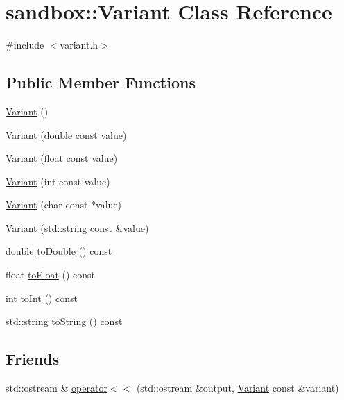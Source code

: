 \hypertarget{classsandbox_1_1_variant}{\section{sandbox\-:\-:Variant Class Reference}
\label{classsandbox_1_1_variant}
}


{\ttfamily \#include $<$variant.\-h$>$}

\subsection*{Public Member Functions}
\begin{DoxyCompactItemize}
\item 
\hyperlink{classsandbox_1_1_variant_a0edc9e6694f15b9938dc40f68cc9464b}{Variant} ()
\item 
\hyperlink{classsandbox_1_1_variant_a762c4c281191a8bb303a317c0e0da8ef}{Variant} (double const value)
\item 
\hyperlink{classsandbox_1_1_variant_a965d4621a0d600a96d02cd696703e82c}{Variant} (float const value)
\item 
\hyperlink{classsandbox_1_1_variant_a8498e32ad2db5751c2b8111a9320a006}{Variant} (int const value)
\item 
\hyperlink{classsandbox_1_1_variant_a3a4600bcd2367d516888ea5ac45e5d25}{Variant} (char const $\ast$value)
\item 
\hyperlink{classsandbox_1_1_variant_a9699b3360dbd4cc4b12f6b5d59d80db0}{Variant} (std\-::string const \&value)
\item 
double \hyperlink{classsandbox_1_1_variant_adcf82c9304b1ab044afb5f511add9f9b}{to\-Double} () const 
\item 
float \hyperlink{classsandbox_1_1_variant_a49e80434a87f7ed714e386ca82e83160}{to\-Float} () const 
\item 
int \hyperlink{classsandbox_1_1_variant_a31944d8717dad852da7dd6927db7e5d6}{to\-Int} () const 
\item 
std\-::string \hyperlink{classsandbox_1_1_variant_a12c2380fc67baff5ac95c21ecf0b7304}{to\-String} () const 
\end{DoxyCompactItemize}
\subsection*{Friends}
\begin{DoxyCompactItemize}
\item 
std\-::ostream \& \hyperlink{classsandbox_1_1_variant_a586cf3576aee021c7b73c7871c6ce427}{operator$<$$<$} (std\-::ostream \&output, \hyperlink{classsandbox_1_1_variant}{Variant} const \&variant)
\end{DoxyCompactItemize}


